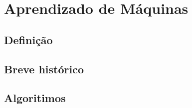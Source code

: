 \chapter{Aprendizado de Máquinas}
\section{Definição}
\section{Breve histórico}
\section{Algoritimos}